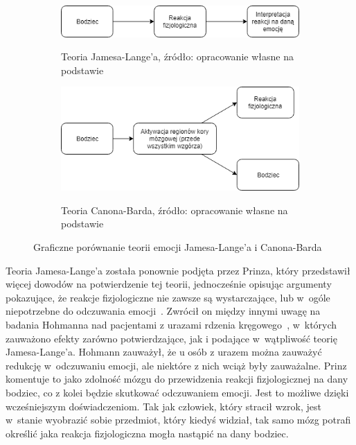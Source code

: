 \begin{figure}[h]
	\centering
	\begin{subfigure}{0.7\textwidth}
		\includegraphics[width=\linewidth]{images/james-lang.png}
		\label{fig:james}
		\caption{Teoria Jamesa-Lange'a, źródło: opracowanie własne na podstawie~\cite{Coleman2011}}
	\end{subfigure}
	\begin{subfigure}{0.7\textwidth}
		\includegraphics[width=\linewidth]{images/cannon-bard.png}
		\label{fig:canon}
		\caption{Teoria Canona-Barda, źródło: opracowanie własne na podstawie~\cite{cannon_1927}}
	\end{subfigure}
	\caption{Graficzne porównanie teorii emocji Jamesa-Lange'a i Canona-Barda}
\end{figure}

Teoria Jamesa-Lange'a została ponownie podjęta przez Prinza, który przedstawił więcej dowodów na potwierdzenie tej teorii, jednocześnie opisując argumenty pokazujące, że reakcje fizjologiczne nie zawsze są wystarczające, lub w~ogóle niepotrzebne do odczuwania emocji~\cite{Prinz2004-PRIEE-2}. Zwrócił on między innymi uwagę na badania Hohmanna nad pacjentami z urazami rdzenia kręgowego~\cite{Hohmann1966SomeEO}, w~których zauważono efekty zarówno potwierdzające, jak i podające w~wątpliwość teorię Jamesa-Lange'a. Hohmann zauważył, że u osób z urazem można zauważyć redukcję w~odczuwaniu emocji, ale niektóre z nich wciąż były zauważalne. Prinz komentuje to jako zdolność mózgu do przewidzenia reakcji fizjologicznej na dany bodziec, co z kolei będzie skutkować odczuwaniem emocji. Jest to możliwe dzięki wcześniejszym doświadczeniom. Tak jak człowiek, który stracił wzrok, jest w~stanie wyobrazić sobie przedmiot, który kiedyś widział, tak samo mózg potrafi określić jaka reakcja fizjologiczna mogła nastąpić na dany bodziec.

